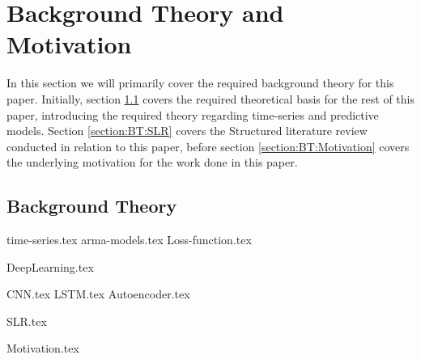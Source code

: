 \chapter{Background Theory and Motivation}\label{T-B}
\label{cha:TheoryAndBackground}


In this section we will primarily cover the required background theory for this paper.
Initially, section \ref{section:BT:BackgroundTheory} covers the required theoretical basis for the rest of this paper,
introducing the required theory regarding time-series and predictive models.
Section \ref{section:BT:SLR} covers the Structured literature review conducted in relation to this paper,
before section \ref{section:BT:Motivation} covers the underlying motivation for the work done in this paper.
 


\section{Background Theory}
\label{section:BT:BackgroundTheory}
{time-series.tex}
{arma-models.tex}
{Loss-function.tex}

{DeepLearning.tex}

{CNN.tex}
{LSTM.tex}
{Autoencoder.tex}



{SLR.tex}


{Motivation.tex}
